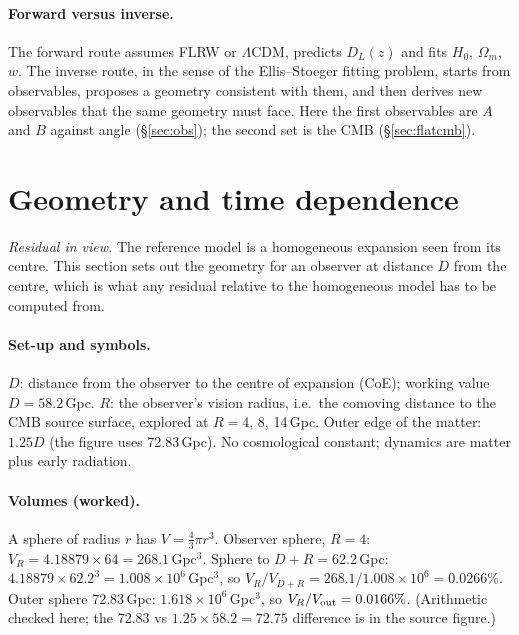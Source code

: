 \documentclass[10pt,twocolumn]{article}
\begin{document}
\paragraph{Forward versus inverse.} The forward route assumes FLRW or $\Lambda$CDM, predicts $D_L(z)$ and fits $H_0$, $\Omega_m$, $w$. The inverse route, in the sense of the Ellis--Stoeger fitting problem, starts from observables, proposes a geometry consistent with them, and then derives new observables that the same geometry must face. Here the first observables are $A$ and $B$ against angle (\S\ref{sec:obs}); the second set is the CMB (\S\ref{sec:flatcmb}).

\section{Geometry and time dependence}
\noindent\emph{Residual in view.} The reference model is a homogeneous expansion seen from its centre. This section sets out the geometry for an observer at distance $D$ from the centre, which is what any residual relative to the homogeneous model has to be computed from.

\paragraph{Set-up and symbols.} $D$: distance from the observer to the centre of expansion (CoE); working value $D=58.2$\,Gpc. $R$: the observer's vision radius, i.e.\ the comoving distance to the CMB source surface, explored at $R=4$, 8, 14\,Gpc. Outer edge of the matter: $1.25D$ (the figure uses 72.83\,Gpc). No cosmological constant; dynamics are matter plus early radiation.

\paragraph{Volumes (worked).} A sphere of radius $r$ has $V=\tfrac43\pi r^3$. Observer sphere, $R=4$: $V_R=4.18879\times64=268.1$\,Gpc$^3$. Sphere to $D+R=62.2$\,Gpc: $4.18879\times62.2^3=1.008\times10^6$\,Gpc$^3$, so $V_R/V_{D+R}=268.1/1.008\times10^6=0.0266\%$. Outer sphere $72.83$\,Gpc: $1.618\times10^6$\,Gpc$^3$, so $V_R/V_{\rm out}=0.0166\%$. (Arithmetic checked here; the 72.83 vs $1.25\times58.2=72.75$ difference is in the source figure.)
\end{document}
